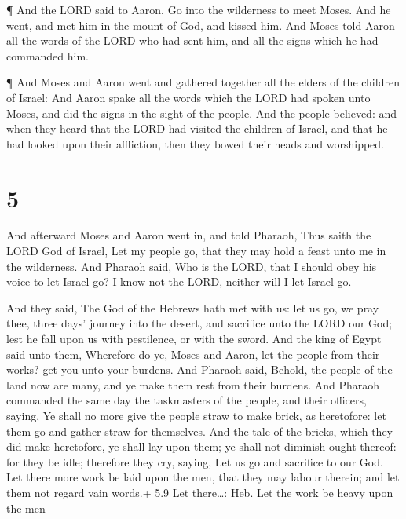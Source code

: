  ¶ And the LORD said to Aaron, Go into the wilderness to
meet Moses. And he went, and met him in the mount of God, and kissed
him.  And Moses told Aaron all the words of the LORD who
had sent him, and all the signs which he had commanded him.

 ¶ And Moses and Aaron went and gathered together all the
elders of the children of Israel:  And Aaron spake all the
words which the LORD had spoken unto Moses, and did the signs in the
sight of the people.  And the people believed: and when
they heard that the LORD had visited the children of Israel, and that he
had looked upon their affliction, then they bowed their heads and
worshipped.

\hypertarget{section-4}{%
\section{5}\label{section-4}}

 And afterward Moses and Aaron went in, and told Pharaoh,
Thus saith the LORD God of Israel, Let my people go, that they may hold
a feast unto me in the wilderness.  And Pharaoh said, Who is
the LORD, that I should obey his voice to let Israel go? I know not the
LORD, neither will I let Israel go.

 And they said, The God of the Hebrews hath met with us: let
us go, we pray thee, three days' journey into the desert, and sacrifice
unto the LORD our God; lest he fall upon us with pestilence, or with the
sword.  And the king of Egypt said unto them, Wherefore do
ye, Moses and Aaron, let the people from their works? get you unto your
burdens.  And Pharaoh said, Behold, the people of the land
now are many, and ye make them rest from their burdens.  And
Pharaoh commanded the same day the taskmasters of the people, and their
officers, saying,  Ye shall no more give the people straw to
make brick, as heretofore: let them go and gather straw for themselves.
 And the tale of the bricks, which they did make heretofore,
ye shall lay upon them; ye shall not diminish ought thereof: for they be
idle; therefore they cry, saying, Let us go and sacrifice to our God.
 Let there more work be laid upon the men, that they may
labour therein; and let them not regard vain words.+ 5.9 Let
there\ldots: Heb. Let the work be heavy upon the men


